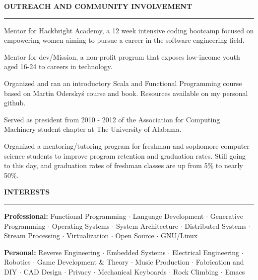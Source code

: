 \documentclass[11pt,letterpaper]{article}
\makeatletter
\newcommand{\header}[1]{%
  \vspace{6pt}%
  {\large\bfseries\color{accent}\MakeUppercase{#1}}\par\nobreak\vspace{-3pt}%
  {\color{accent}\rule{\linewidth}{0.9pt}}\par\nobreak\vspace{3pt}%
  \@afterheading}
\makeatother
\begin{document}
\vspace*{3pt}

\header{Outreach and Community Involvement}
\begin{itemize*}
\item Mentor for Hackbright Academy, a 12 week intensive coding bootcamp focused
  on empowering women aiming to pursue a career in the software engineering field.
\item Mentor for dev/Mission, a non-profit program that exposes low-income youth aged 16-24 to careers in technology.
\item Organized and ran an introductory Scala and Functional Programming
  course based on Martin Odersky\'s course and book. Resources available on
  my personal github.
\item Served as president from 2010 - 2012 of the Association for Computing
  Machinery student chapter at The University of Alabama.
\item Organized a mentoring/tutoring program for freshman and sophomore computer
  science students to improve program retention and graduation
  rates. Still going to this day, and graduation rates of freshman classes are
  up from 5\% to nearly 50\%.
\end{itemize*}

\newpage

\header{Interests}
\begin{itemize*}
\item \textbf{Professional:} Functional Programming $\cdot$ Language Development $\cdot$
  Generative Programming $\cdot$ Operating Systems $\cdot$ System Architecture $\cdot$
  Distributed Systems $\cdot$ Stream Processing $\cdot$ Virtualization $\cdot$ Open Source
  $\cdot$ GNU/Linux
\item \textbf{Personal:} Reverse Engineering $\cdot$ Embedded Systems $\cdot$ Electrical
  Engineering $\cdot$ Robotics $\cdot$ Game Development \& Theory $\cdot$ Music Production
  $\cdot$ Fabrication and DIY $\cdot$ CAD Design $\cdot$ Privacy $\cdot$ Mechanical Keyboards
  $\cdot$ Rock Climbing $\cdot$ Emacs
\end{itemize*}
\vspace*{8pt}
\end{document}
